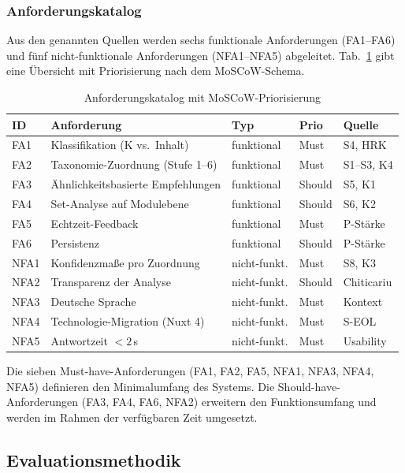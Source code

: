 \subsubsection{Anforderungskatalog}\label{sec:anf-katalog}

Aus den genannten Quellen werden sechs funktionale Anforderungen (FA1--FA6) und fünf nicht-funktionale Anforderungen (NFA1--NFA5) abgeleitet.
Tab.~\ref{tab:anforderungen} gibt eine Übersicht mit Priorisierung nach dem MoSCoW-Schema.

\begin{table}[H]
\caption{Anforderungskatalog mit MoSCoW-Priorisierung\label{tab:anforderungen}}
\centering
\small
\begin{tabular}{lllll}
\hline
\textbf{ID} & \textbf{Anforderung} & \textbf{Typ} & \textbf{Prio} & \textbf{Quelle} \\
\hline
FA1 & Klassifikation (K vs.\ Inhalt) & funktional & Must & S4, HRK \\
FA2 & Taxonomie-Zuordnung (Stufe 1--6) & funktional & Must & S1--S3, K4 \\
FA3 & Ähnlichkeitsbasierte Empfehlungen & funktional & Should & S5, K1 \\
FA4 & Set-Analyse auf Modulebene & funktional & Should & S6, K2 \\
FA5 & Echtzeit-Feedback & funktional & Must & P-Stärke \\
FA6 & Persistenz & funktional & Should & P-Stärke \\
\hline
NFA1 & Konfidenzmaße pro Zuordnung & nicht-funkt. & Must & S8, K3 \\
NFA2 & Transparenz der Analyse & nicht-funkt. & Should & Chiticariu \\
NFA3 & Deutsche Sprache & nicht-funkt. & Must & Kontext \\
NFA4 & Technologie-Migration (Nuxt 4) & nicht-funkt. & Must & S-EOL \\
NFA5 & Antwortzeit $< 2$\,s & nicht-funkt. & Must & Usability \\
\hline
\end{tabular}
\end{table}

Die sieben Must-have-Anforderungen (FA1, FA2, FA5, NFA1, NFA3, NFA4, NFA5) definieren den Minimalumfang des Systems.
Die Should-have-Anforderungen (FA3, FA4, FA6, NFA2) erweitern den Funktionsumfang und werden im Rahmen der verfügbaren Zeit umgesetzt.

\subsection{Evaluationsmethodik}\label{sec:eval-methodik}

